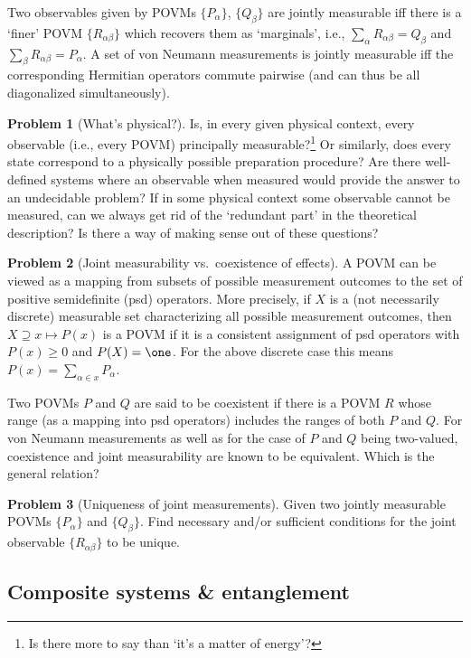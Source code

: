 \documentclass[11pt,a4paper]{article}
\theoremstyle{plain}
\theoremstyle{definition}
\newtheorem{problem}{Problem}
\theoremstyle{remark}
\numberwithin{equation}{section}
\begin{document}
Two observables given by POVMs $\{P_\alpha\}$, $\{Q_\beta\}$ are jointly measurable iff there is a `finer' POVM $\{R_{\alpha\beta}\}$ which recovers them as `marginals', i.e., $\sum_\alpha R_{\alpha\beta}=Q_\beta$ and $\sum_\beta R_{\alpha\beta}=P_\alpha$. A set of von Neumann measurements is jointly measurable iff the corresponding Hermitian operators commute pairwise (and can thus be all diagonalized simultaneously).

\begin{problem}[What's physical?]
Is, in every given physical context, every observable (i.e., every POVM) principally measurable?\footnote{Is there more to say than `it's a matter of energy'?} Or similarly, does every state correspond to a physically possible preparation procedure? Are there well-defined systems where an observable when measured would provide the answer to an undecidable problem? If in some physical context some observable cannot be measured, can we always get rid of the `redundant part' in the theoretical description? Is there a way of making sense out of these questions?
\end{problem}

\begin{problem}[Joint measurability vs.\ coexistence of effects]
A POVM can be viewed as a mapping from subsets of possible measurement outcomes to the set of positive semidefinite (psd) operators. More precisely, if $X$ is a (not necessarily discrete) measurable set characterizing all possible measurement outcomes, then $X\supseteq x\mapsto P(x)$ is a POVM if it is a consistent assignment of psd operators with $P(x)\ge 0$ and $P(X)=\one$. For the above discrete case this means $P(x)=\sum_{\alpha\in x} P_\alpha$.

Two POVMs $P$ and $Q$ are said to be coexistent if there is a POVM $R$ whose range (as a mapping into psd operators) includes the ranges of both $P$ and $Q$. For von Neumann measurements as well as for the case of $P$ and $Q$ being two-valued, coexistence and joint measurability are known to be equivalent. Which is the general relation?
\end{problem}

\begin{problem}[Uniqueness of joint measurements]
Given two jointly measurable POVMs $\{P_\alpha\}$ and $\{Q_\beta\}$. Find necessary and/or sufficient conditions for the joint observable $\{R_{\alpha\beta}\}$ to be unique.
\end{problem}

\subsection{Composite systems \& entanglement}
\end{document}
